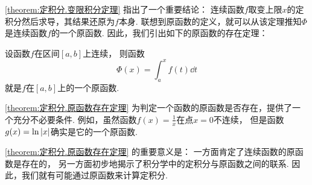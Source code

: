 \cref{theorem:定积分.变限积分定理} 指出了一个重要结论：
连续函数\(f\)取变上限\(x\)的定积分然后求导，其结果还原为\(f\)本身.
联想到原函数的定义，就可以从该定理推知\(\Phi\)是连续函数\(f\)的一个原函数.
因此，我们引出如下的原函数的存在定理：
\begin{theorem}[原函数存在定理]\label{theorem:定积分.原函数存在定理}
设函数\(f\)在区间\([a,b]\)上连续，
则函数\[
	\Phi(x) = \int_a^x f(t) \dd{t}
\]就是\(f\)在\([a,b]\)上的一个原函数.
\end{theorem}
\begin{remark}
\cref{theorem:定积分.原函数存在定理} 为判定一个函数的原函数是否存在，提供了一个充分不必要条件.
例如，虽然函数\(f(x) = \frac1x\)在点\(x=0\)不连续，
但是函数\(g(x) = \ln\abs{x}\)确实是它的一个原函数.
\end{remark}
\begin{remark}
\cref{theorem:定积分.原函数存在定理} 的重要意义是：
一方面肯定了连续函数的原函数是存在的，
另一方面初步地揭示了积分学中的定积分与原函数之间的联系.
因此，我们就有可能通过原函数来计算定积分.
\end{remark}

